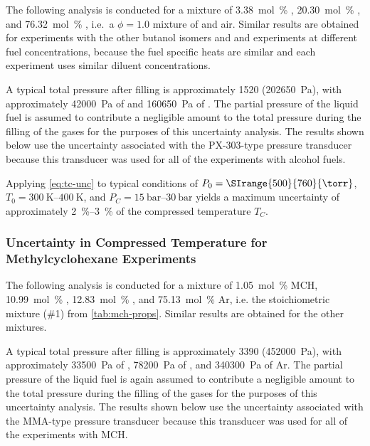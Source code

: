 \documentclass[../main.tex]{subfiles}
\begin{document}
The following analysis is conducted for a mixture of
\SI{3.38}{\mole\percent} \tBuOH{}, \SI{20.30}{\mole\percent} , and
\SI{76.32}{\mole\percent} , i.e.\ a $\phi=1.0$ mixture of \tBuOH{}
and air. Similar results are obtained for experiments with the other butanol
isomers and \iPeOH{} and experiments at different fuel concentrations,
because the fuel specific heats are similar and each experiment uses
similar diluent concentrations.

A typical total pressure after filling is approximately
\SI{1520}{\torr} (\SI{202650}{\pascal}), with approximately
\SI{42000}{\pascal} of  and \SI{160650}{\pascal} of . The partial
pressure of the liquid fuel is assumed to contribute a negligible amount
to the total pressure during the filling of the gases for the purposes of
this uncertainty analysis. The results shown below use the
uncertainty associated with the PX-303-type pressure transducer because
this transducer was used for all of the experiments with alcohol fuels.

Applying \cref{eq:tc-unc} to typical conditions of $P_0 = \SIrange{500}{760}{\torr}$,
$T_0=\SIrange{300}{400}{\kelvin}$, and $P_C=\SIrange{15}{30}{\bar}$ yields
a maximum uncertainty of approximately \SIrange{2}{3}{\percent} of the
compressed temperature $T_C$.

\subsubsection{Uncertainty in Compressed Temperature for Methylcyclohexane Experiments}
\label{sec:unc-mch}

The following analysis is conducted for a mixture of
\SI{1.05}{\mole\percent} MCH, \SI{10.99}{\mole\percent} ,
\SI{12.83}{\mole\percent} , and \SI{75.13}{\mole\percent} Ar, i.e.
the stoichiometric mixture (\#1) from \cref{tab:mch-props}. Similar
results are obtained for the other mixtures.

A typical total pressure after filling is approximately
\SI{3390}{\torr} (\SI{452000}{\pascal}), with approximately
\SI{33500}{\pascal} of , \SI{78200}{\pascal} of , and
\SI{340300}{\pascal} of Ar. The partial pressure of the liquid fuel is
again assumed to contribute a negligible amount to the total pressure
during the filling of the gases for the purposes of this uncertainty
analysis. The results shown below use the uncertainty associated with
the MMA-type pressure transducer because this transducer was used for
all of the experiments with MCH.
\end{document}
